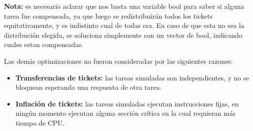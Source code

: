 \textbf{Nota:} es necesario aclarar que nos basta una variable bool para saber si alguna tarea fue compensada, ya que luego se redistribuir\'an todos los tickets equitativamente, y es indistinto cual de todas era. En caso de que esta no sea la distribuci\'on elegida, se soluciona simplemente con un vector de bool, indicando cuales estan compensadas.

\vspace{2mm}
Las dem\'as optimizaciones no fueron consideradas por las siguientes razones:

\begin{itemize}

\item \textbf{Transferencias de tickets:} las tareas simuladas son independientes, y no se bloquean esperando una respuesta de otra tarea.

\item \textbf{Inflaci\'on de tickets:} las tareas simuladas ejecutan instrucciones fijas, en ning\'un momento ejecutan alguna secci\'on cr\'itica en la cual requieran m\'as tiempo de CPU. 

\end{itemize}

